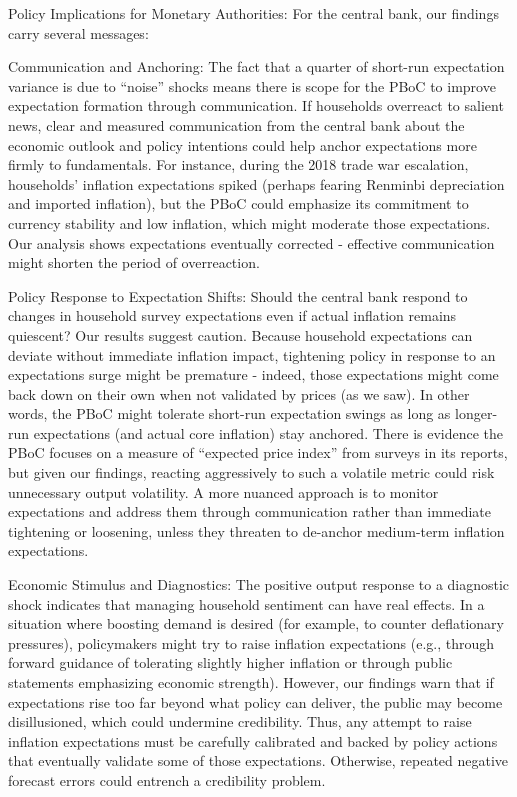 \documentclass[12pt]{article}
\begin{document}
Policy Implications for Monetary Authorities: For the central bank, our findings carry several messages:

Communication and Anchoring: The fact that a quarter of short-run expectation variance is due to “noise” shocks means there is scope for the PBoC to improve expectation formation through communication. If households overreact to salient news, clear and measured communication from the central bank about the economic outlook and policy intentions could help anchor expectations more firmly to fundamentals. For instance, during the 2018 trade war escalation, households' inflation expectations spiked (perhaps fearing Renminbi depreciation and imported inflation), but the PBoC could emphasize its commitment to currency stability and low inflation, which might moderate those expectations. Our analysis shows expectations eventually corrected - effective communication might shorten the period of overreaction.

Policy Response to Expectation Shifts: Should the central bank respond to changes in household survey expectations even if actual inflation remains quiescent? Our results suggest caution. Because household expectations can deviate without immediate inflation impact, tightening policy in response to an expectations surge might be premature - indeed, those expectations might come back down on their own when not validated by prices (as we saw). In other words, the PBoC might tolerate short-run expectation swings as long as longer-run expectations (and actual core inflation) stay anchored. There is evidence the PBoC focuses on a measure of “expected price index” from surveys in its reports, but given our findings, reacting aggressively to such a volatile metric could risk unnecessary output volatility. A more nuanced approach is to monitor expectations and address them through communication rather than immediate tightening or loosening, unless they threaten to de-anchor medium-term inflation expectations.

Economic Stimulus and Diagnostics: The positive output response to a diagnostic shock indicates that managing household sentiment can have real effects. In a situation where boosting demand is desired (for example, to counter deflationary pressures), policymakers might try to raise inflation expectations (e.g., through forward guidance of tolerating slightly higher inflation or through public statements emphasizing economic strength). However, our findings warn that if expectations rise too far beyond what policy can deliver, the public may become disillusioned, which could undermine credibility. Thus, any attempt to raise inflation expectations must be carefully calibrated and backed by policy actions that eventually validate some of those expectations. Otherwise, repeated negative forecast errors could entrench a credibility problem.
\end{document}
